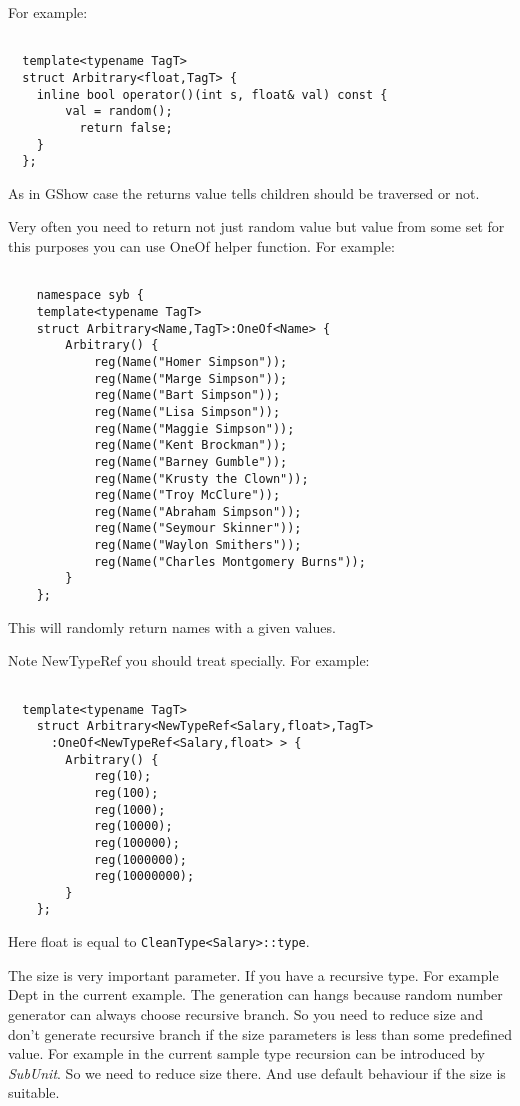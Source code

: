 \documentclass[a4paper]{article}
\begin{document}
For example:

\begin{lstlisting}

  template<typename TagT>
  struct Arbitrary<float,TagT> {
  	inline bool operator()(int s, float& val) const {
	  	val = random();
		  return false;
  	}
  };

\end{lstlisting}

As in GShow case the returns value tells children should be traversed or not.

Very often you need to return not just random value but value from some set for this 
purposes you can use OneOf helper function. For example:

\begin{lstlisting}

	namespace syb {
	template<typename TagT>
	struct Arbitrary<Name,TagT>:OneOf<Name> {
		Arbitrary() {
			reg(Name("Homer Simpson"));
			reg(Name("Marge Simpson"));
			reg(Name("Bart Simpson"));
			reg(Name("Lisa Simpson"));
			reg(Name("Maggie Simpson"));
			reg(Name("Kent Brockman"));
			reg(Name("Barney Gumble"));
			reg(Name("Krusty the Clown"));
			reg(Name("Troy McClure"));
			reg(Name("Abraham Simpson"));
			reg(Name("Seymour Skinner"));
			reg(Name("Waylon Smithers"));
			reg(Name("Charles Montgomery Burns"));
		}
	};

\end{lstlisting}

This will randomly return names with a given values.

Note NewTypeRef you should treat specially. For example:

\begin{lstlisting}

  template<typename TagT>
	struct Arbitrary<NewTypeRef<Salary,float>,TagT>
      :OneOf<NewTypeRef<Salary,float> > {
		Arbitrary() {
			reg(10);
			reg(100);
			reg(1000);
			reg(10000);
			reg(100000);
			reg(1000000);
			reg(10000000);
		}
	};

\end{lstlisting}

Here float is equal to \lstinline{CleanType<Salary>::type}.

The size is very important parameter. If you have a recursive type. For example
Dept in the current example. The generation can hangs because random number generator
can always choose recursive branch. So you need to reduce size and don't generate
recursive branch if the size parameters is less than some predefined value. For example in
the current sample type recursion can be introduced by \emph{SubUnit}. So we need
to reduce size there. And use default behaviour if the size is suitable.
\end{document}
